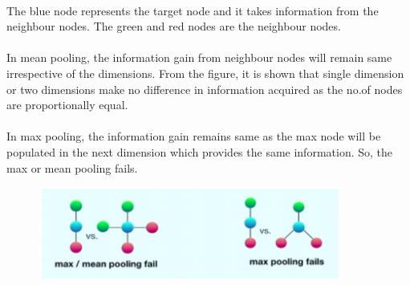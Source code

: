 \paragraph{}The blue node represents the target node and it takes information from the neighbour nodes. The green and red nodes are the neighbour nodes.
\paragraph{}In mean pooling, the information gain from neighbour nodes will remain same irrespective of the dimensions. From the figure, it is shown that single dimension or two dimensions make no difference in information acquired as the no.of nodes are proportionally equal.
\paragraph{}
In max pooling, the information gain remains same as the max node will be populated in the next dimension which provides the same information. So, the max or mean pooling fails.

\begin{figure}[h]
    \centering
    \includegraphics[width=10cm,height=3cm]{tex/img/Limitation.png}
\end{figure}
